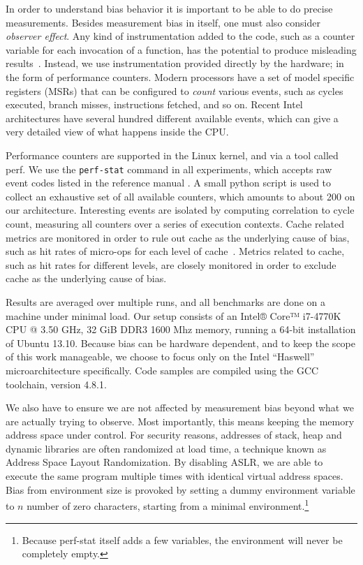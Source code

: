\documentclass[a4paper,10pt,twocolumn,twoside]{article}
\begin{document}
In order to understand bias behavior it is important to be able to do precise measurements.
Besides measurement bias in itself, one must also consider \emph{observer effect}.
Any kind of instrumentation added to the code, such as a counter variable for each invocation of a function, has the potential to produce misleading results~\cite{Mytkowicz:2008:OE&MB}.
Instead, we use instrumentation provided directly by the hardware; in the form of performance counters. 
Modern processors have a set of model specific registers (MSRs) that can be configured to \emph{count} various events, such as cycles executed, branch misses, instructions fetched, and so on.
Recent Intel architectures have several hundred different available events, which can give a very detailed view of what happens inside the CPU.

Performance counters are supported in the Linux kernel, and via a tool called perf. 
We use the \texttt{perf-stat} command in all experiments, which accepts raw event codes listed in the reference manual \cite{Intel:2013:Volume3B}.
A small python script is used to collect an exhaustive set of all available counters, which amounts to about 200 on our architecture.
Interesting events are isolated by computing correlation to cycle count, measuring all counters over a series of execution contexts.
Cache related metrics are monitored in order to rule out cache as the underlying cause of bias, such as hit rates of micro-ops for each level of cache~\cite{Intel:2012:OptimizationManual}.
Metrics related to cache, such as hit rates for different levels, are closely monitored in order to exclude cache as the underlying cause of bias.

Results are averaged over multiple runs, and all benchmarks are done on a machine under minimal load.
Our setup consists of an Intel® Core™ i7-4770K CPU @ 3.50 GHz, 32 GiB DDR3 1600 Mhz memory, running a 64-bit installation of Ubuntu 13.10.
Because bias can be hardware dependent, and to keep the scope of this work manageable, we choose to focus only on the Intel ``Haswell'' microarchitecture specifically.
Code samples are compiled using the GCC toolchain, version 4.8.1.

We also have to ensure we are not affected by measurement bias beyond what we are actually trying to observe.
Most importantly, this means keeping the memory address space under control.
For security reasons, addresses of stack, heap and dynamic libraries are often randomized at load time, a technique known as Address Space Layout Randomization.\cite{Shackham:2004:ASLR} %
By disabling ASLR, we are able to execute the same program multiple times with identical virtual address spaces.
Bias from environment size is provoked by setting a dummy environment variable to $n$ number of zero characters, starting from a minimal environment.\footnote{Because perf-stat itself adds a few variables, the environment will never be completely empty.}
\end{document}
